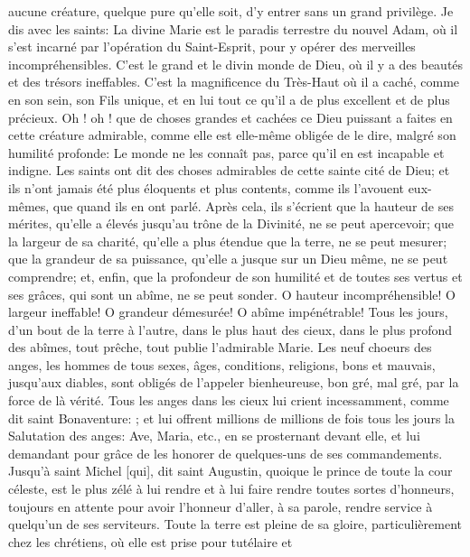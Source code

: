 aucune créature, quelque pure qu'elle soit, d'y entrer sans un grand privilège.
 Je dis avec les saints: La divine Marie est le paradis terrestre du nouvel Adam, où il s'est incarné par l'opération
du Saint-Esprit, pour y opérer des merveilles incompréhensibles. C'est le grand et le divin monde de Dieu, où il y a
des beautés et des trésors ineffables. C'est la magnificence du Très-Haut où il a caché, comme en son sein, son
Fils unique, et en lui tout ce qu'il a de plus excellent et de plus précieux. Oh ! oh ! que de choses grandes et
cachées ce Dieu puissant a faites en cette créature admirable, comme elle est elle-même obligée de le dire,
malgré son humilité profonde:  Le monde ne les connaît pas, parce qu'il en est
incapable et indigne.
 Les saints ont dit des choses admirables de cette sainte cité de Dieu; et ils n'ont jamais été plus éloquents et
plus contents, comme ils l'avouent eux-mêmes, que quand ils en ont parlé. Après cela, ils s'écrient que la hauteur
de ses mérites, qu'elle a élevés jusqu'au trône de la Divinité, ne se peut apercevoir; que la largeur de sa charité,
qu'elle a plus étendue que la terre, ne se peut mesurer; que la grandeur de sa puissance, qu'elle a jusque sur un
Dieu même, ne se peut comprendre; et, enfin, que la profondeur de son humilité et de toutes ses vertus et ses
grâces, qui sont un abîme, ne se peut sonder. O hauteur incompréhensible! O largeur ineffable! O grandeur
démesurée! O abîme impénétrable!
 Tous les jours, d'un bout de la terre à l'autre, dans le plus haut des cieux, dans le plus profond des abîmes, tout
prêche, tout publie l'admirable Marie. Les neuf choeurs des anges, les hommes de tous sexes, âges, conditions,
religions, bons et mauvais, jusqu'aux diables, sont obligés de l'appeler bienheureuse, bon gré, mal gré, par la force
de là vérité. Tous les anges dans les cieux lui crient incessamment, comme dit saint Bonaventure: ; et lui offrent millions de millions de fois tous les jours la Salutation des anges:
Ave, Maria, etc., en se prosternant devant elle, et lui demandant pour grâce de les honorer de quelques-uns de
ses commandements. Jusqu'à saint Michel [qui], dit saint Augustin, quoique le prince de toute la cour céleste, est
le plus zélé à lui rendre et à lui faire rendre toutes sortes d'honneurs, toujours en attente pour avoir l'honneur
d'aller, à sa parole, rendre service à quelqu'un de ses serviteurs.
 Toute la terre est pleine de sa gloire, particulièrement chez les chrétiens, où elle est prise pour tutélaire et
